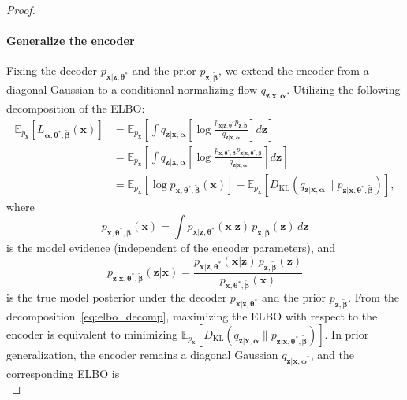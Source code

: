 \documentclass[10pt,a4paper]{amsart}
\newcommand{\mb}{\boldsymbol}
\begin{document}
\begin{proof}
\paragraph{Generalize the encoder} 
Fixing the decoder $p_{\mb{x}|\mb{z},\mb{\theta}^*}$ and the prior $p_{\mb{z},\tilde{\mb{\beta}}}$, we extend the encoder from a diagonal Gaussian to a conditional normalizing flow $q_{\mb{z}|\mb{x},\boldsymbol{\alpha}}$. Utilizing the following decomposition of the ELBO: 
\begin{align}
\mathbb{E}_{p_{\mb{x}}}[L_{\mb{\alpha},\mb{\theta}^*,\tilde{\mb{\beta}}}(\mb{x})]
&= \mathbb{E}_{p_{\mb{x}}}\left[\int q_{\mb{z}|\mb{x},\mb{\alpha}}\left[\log\frac{p_{\mb{x}|\mb{z},\mb{\theta}^*}p_{\mb{z},\tilde{\mb{\beta}}}}{q_{\mb{z}|\mb{x},\mb{\alpha}}}\right]d\mb{z}\right] \nonumber\\
&= \mathbb{E}_{p_{\mb{x}}}\left[\int q_{\mb{z}|\mb{x},\mb{\alpha}}\left[\log\frac{p_{\mb{x},\mb{\theta}^*,\tilde{\mb{\beta}}}p_{\mb{z}|\mb{x},\mb{\theta}^*,\tilde{\mb{\beta}}}}{q_{\mb{z}|\mb{x},\mb{\alpha}}}\right]d\mb{z}\right] \nonumber\\
&=\mathbb{E}_{p_{\mb{x}}}[\log p_{\mb{x},\mb{\theta}^*,\tilde{\mb{\beta}}}(\mb{x})]
- \mathbb{E}_{p_{\mb{x}}}[D_{\mathrm{KL}}(q_{\mb{z}|\mb{x},\mb{\alpha}} \| p_{\mb{z}|\mb{x},\mb{\theta}^*,\tilde{\mb{\beta}}})],\label{eq:elbo_decomp}
\end{align}
where
\begin{equation}
p_{\mb{x},\mb{\theta}^*,\tilde{\mb{\beta}}}(\mb{x}) = \int p_{\mb{x}|\mb{z},\mb{\theta}^*}(\mb{x}|\mb{z})\, p_{\mb{z},\tilde{\mb{\beta}}}(\mb{z})\, d\mb{z}
\end{equation}
is the model evidence (independent of the encoder parameters), and
\begin{equation}
p_{\mb{z}|\mb{x},\mb{\theta}^*,\tilde{\mb{\beta}}}(\mb{z}|\mb{x})
= \frac{p_{\mb{x}|\mb{z},\mb{\theta}^*}(\mb{x}|\mb{z})\, p_{\mb{z},\tilde{\mb{\beta}}}(\mb{z})}{p_{\mb{x},\mb{\theta}^*,\tilde{\mb{\beta}}}(\mb{x})}
\end{equation}
is the true model posterior under the decoder $p_{\mb{x}|\mb{z},\mb{\theta}^*}$ and the prior $p_{\mb{z},\tilde{\mb{\beta}}}$.
From the decomposition~\eqref{eq:elbo_decomp}, maximizing the ELBO with respect to the encoder is equivalent to minimizing $\mathbb{E}_{p_{\mb{x}}}[D_{\mathrm{KL}}(q_{\mb{z}|\mb{x},\mb{\alpha}} \| p_{\mb{z}|\mb{x},\mb{\theta}^*,\tilde{\mb{\beta}}})]$. In prior generalization, the encoder remains a diagonal Gaussian $q_{\mb{z}|\mb{x},\mb{\phi}^*}$, and the corresponding ELBO is
\begin{equation}

\end{equation}
\end{proof}
\end{document}
